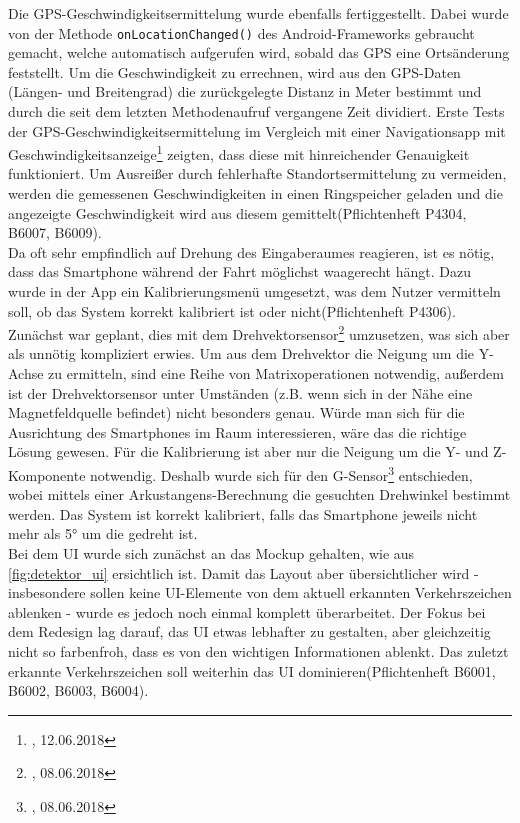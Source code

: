 \documentclass[12pt,a4paper,ngerman,enabledeprecatedfontcommands]{scrreprt}
\begin{document}
Die GPS-Geschwindigkeitsermittelung wurde ebenfalls fertiggestellt. Dabei wurde von der Methode \texttt{onLocationChanged()} des Android-Frameworks gebraucht gemacht, welche automatisch aufgerufen wird, sobald das GPS eine Ortsänderung feststellt. Um die Geschwindigkeit zu errechnen, wird aus den GPS-Daten (Längen- und Breitengrad) die zurückgelegte Distanz in Meter bestimmt und durch die seit dem letzten Methodenaufruf vergangene Zeit dividiert. Erste Tests der GPS-Geschwindigkeitsermittelung im Vergleich mit einer Navigationsapp mit Geschwindigkeitsanzeige\footnote{, 12.06.2018} zeigten, dass diese mit hinreichender Genauigkeit funktioniert. Um Ausreißer durch fehlerhafte Standortsermittelung zu vermeiden, werden die gemessenen Geschwindigkeiten in einen Ringspeicher geladen und die angezeigte Geschwindigkeit wird aus diesem gemittelt(Pflichtenheft P4304, B6007, B6009).\\

Da  oft sehr empfindlich auf Drehung des Eingaberaumes reagieren, ist es nötig, dass das \gls{Smartphone} während der Fahrt möglichst waagerecht hängt. Dazu wurde in der \gls{App} ein Kalibrierungsmenü umgesetzt, was dem \gls{Nutzer} vermitteln soll, ob das \gls{System} korrekt kalibriert ist oder nicht(Pflichtenheft P4306). Zunächst war geplant, dies mit dem Drehvektorsensor\footnote{, 08.06.2018} umzusetzen, was sich aber als unnötig kompliziert erwies. Um aus dem Drehvektor die Neigung um die Y-Achse zu ermitteln, sind eine Reihe von Matrixoperationen notwendig, außerdem ist der Drehvektorsensor unter Umständen (z.B. wenn sich in der Nähe eine Magnetfeldquelle befindet) nicht besonders genau. Würde man sich für die Ausrichtung des \gls{Smartphone}s im Raum interessieren, wäre das die richtige Lösung gewesen. Für die Kalibrierung ist aber nur die Neigung um die Y- und Z-Komponente notwendig. Deshalb wurde sich für den G-Sensor\footnote{, 08.06.2018} entschieden, wobei mittels einer Arkustangens-Berechnung die gesuchten Drehwinkel bestimmt werden. Das \gls{System} ist korrekt kalibriert, falls das \gls{Smartphone} jeweils nicht mehr als 5° um die  gedreht ist.\\

Bei dem \gls{UI} wurde sich zunächst an das Mockup gehalten, wie aus \cref{fig:detektor_ui} ersichtlich ist. Damit das Layout aber übersichtlicher wird - insbesondere sollen keine UI-Elemente von dem aktuell erkannten Verkehrszeichen ablenken - wurde es jedoch noch einmal komplett überarbeitet. Der Fokus bei dem Redesign lag darauf, das \gls{UI} etwas lebhafter zu gestalten, aber gleichzeitig nicht so farbenfroh, dass es von den wichtigen Informationen ablenkt. Das zuletzt erkannte Verkehrszeichen soll weiterhin das \gls{UI} dominieren(Pflichtenheft B6001, B6002, B6003, B6004).\\
\end{document}
